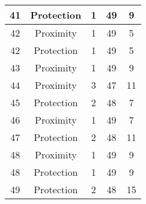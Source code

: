\documentclass[results.tex]{subfiles}
\begin{document}
\begin{center}
\begin{tabular}{| c || c | c | c | c |}
            \hline
            41                      & Protection                   & 1                      & 49                      & 9                    \\
            \hline
            42                      & Proximity                    & 1                      & 49                      & 5                    \\
            \hline
            42                      & Protection                   & 1                      & 49                      & 5                    \\
            \hline
            43                      & Proximity                    & 1                      & 49                      & 9                    \\
            \hline
            44                      & Proximity                    & 3                      & 47                      & 11                   \\
            \hline
            45                      & Protection                   & 2                      & 48                      & 7                    \\
            \hline
            46                      & Proximity                    & 1                      & 49                      & 7                    \\
            \hline
            47                      & Protection                   & 2                      & 48                      & 11                   \\
            \hline
            48                      & Proximity                    & 1                      & 49                      & 9                    \\
            \hline
            48                      & Protection                   & 1                      & 49                      & 9                    \\
            \hline
            49                      & Protection                   & 2                      & 48                      & 15                   \\
            \hline
        \end{tabular}
    \end{center}
\end{document}
